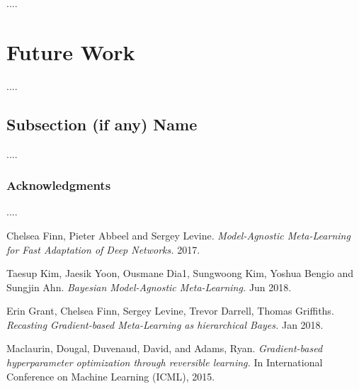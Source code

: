 \documentclass[a4paper]{article}
\begin{document}
....

\section*{Future Work}

....

\subsection*{Subsection (if any) Name}

....

\subsubsection*{Acknowledgments}

....
\pagebreak
\begin{thebibliography}{9}
Chelsea Finn, Pieter Abbeel and Sergey Levine.
\textit{Model-Agnostic Meta-Learning for Fast Adaptation of Deep Networks.}
2017.

Taesup Kim, Jaesik Yoon, Ousmane Dia1, Sungwoong Kim, Yoshua Bengio and Sungjin Ahn.
\textit{Bayesian Model-Agnostic Meta-Learning.}
Jun 2018.

Erin Grant, Chelsea Finn, Sergey Levine, Trevor Darrell, Thomas Griffiths.
\textit{Recasting Gradient-based Meta-Learning as hierarchical Bayes.}
Jan 2018.

Maclaurin, Dougal, Duvenaud, David, and Adams, Ryan.
\textit{Gradient-based hyperparameter optimization through reversible learning.}
In International Conference on Machine Learning (ICML), 2015.
\end{thebibliography}
\end{document}
